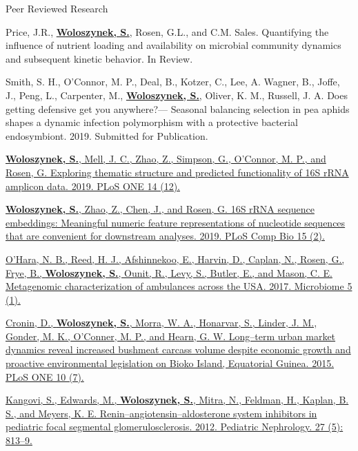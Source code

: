 

\begin{cventries}

\cventry
    {}
    {Peer Reviewed Research}
    {}
    {}
    {
     \begin{cvitems} %
        \item{Price, J.R., \textbf{\underline{Woloszynek, S.}}, Rosen, G.L., and C.M. Sales. Quantifying the influence of nutrient loading and availability on microbial community dynamics and subsequent kinetic behavior. In Review.}
        \item{Smith, S. H., O'Connor, M. P., Deal, B., Kotzer, C., Lee, A. Wagner, B., Joffe, J., Peng, L., Carpenter, M., \textbf{\underline{Woloszynek, S.}}, Oliver, K. M., Russell, J. A. Does getting defensive get you anywhere?— Seasonal balancing selection in pea aphids shapes a dynamic infection polymorphism with a protective bacterial endosymbiont. 2019. Submitted for Publication.}
        \item{\href{https://doi.org/10.1371/journal.pone.0219235}{\textbf{\underline{Woloszynek, S.}}, Mell, J. C., Zhao, Z., Simpson, G., O’Connor, M. P., and Rosen, G. Exploring thematic structure and predicted functionality of 16S rRNA amplicon data. 2019. PLoS ONE 14 (12).}}
        \item{\href{https://doi.org/10.1371/journal.pcbi.1006721}{\textbf{\underline{Woloszynek, S.}}, Zhao, Z., Chen, J., and Rosen, G. 16S rRNA sequence embeddings: Meaningful numeric feature representations of nucleotide sequences that are convenient for downstream analyses. 2019. PLoS Comp Bio 15 (2).}}
        \item{\href{https://doi.org/10.1186/s40168-017-0339-6}{O’Hara, N. B., Reed, H. J., Afshinnekoo, E., Harvin, D., Caplan, N., Rosen, G., Frye, B., \textbf{\underline{Woloszynek, S.}}, Ounit, R., Levy, S., Butler, E., and Mason, C. E. Metagenomic characterization of ambulances across the USA. 2017. Microbiome 5 (1).}}
        \item{\href{https://doi.org/10.1371/journal.pone.0134464}{Cronin, D., \textbf{\underline{Woloszynek, S.}}, Morra, W. A., Honarvar, S., Linder, J. M., Gonder, M. K., O’Conner, M. P., and Hearn, G. W. Long–term urban market dynamics reveal increased bushmeat carcass volume despite economic growth and proactive environmental legislation on Bioko Island, Equatorial Guinea. 2015. PLoS ONE 10 (7).}}
        \item{\href{https://doi.org/10.1007/s00467-011-2056-x}{Kangovi, S., Edwards, M., \textbf{\underline{Woloszynek, S.}}, Mitra, N., Feldman, H., Kaplan, B. S., and Meyers, K. E. Renin–angiotensin–aldosterone system inhibitors in pediatric focal segmental glomerulosclerosis. 2012. Pediatric Nephrology. 27 (5): 813–9.}}
      \end{cvitems}
    }
    

\end{cventries}
